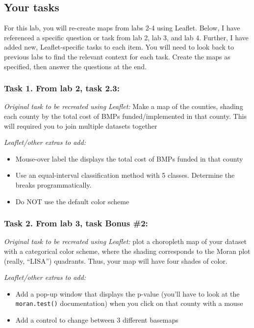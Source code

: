\documentclass[]{article}
\begin{document}
\hypertarget{your-tasks}{%
\subsection{Your tasks}\label{your-tasks}}

For this lab, you will re-create maps from labs 2-4 using Leaflet.
Below, I have referenced a specific question or task from lab 2, lab 3,
and lab 4. Further, I have added new, Leaflet-specific tasks to each
item. You will need to look back to previous labs to find the relevant
context for each task. Create the maps as specified, then answer the
questions at the end.

\hypertarget{task-1.-from-lab-2-task-2.3}{%
\subsubsection{Task 1. From lab 2, task
2.3:}\label{task-1.-from-lab-2-task-2.3}}

\emph{Original task to be recreated using Leaflet:} Make a map of the
counties, shading each county by the total cost of BMPs
funded/implemented in that county. This will required you to join
multiple datasets together

\emph{Leaflet/other extras to add:}

\begin{itemize}
\item
  Mouse-over label the displays the total cost of BMPs funded in that
  county
\item
  Use an equal-interval classification method with 5 classes. Determine
  the breaks programmatically.
\item
  Do NOT use the default color scheme
\end{itemize}

\hypertarget{task-2.-from-lab-3-task-bonus-2}{%
\subsubsection{Task 2. From lab 3, task Bonus
\#2:}\label{task-2.-from-lab-3-task-bonus-2}}

\emph{Original task to be recreated using Leaflet:} plot a choropleth
map of your dataset with a categorical color scheme, where the shading
corresponds to the Moran plot (really, ``LISA'') quadrants. Thus, your
map will have four shades of color.

\emph{Leaflet/other extras to add:}

\begin{itemize}
\item
  Add a pop-up window that displays the p-value (you'll have to look at
  the \texttt{moran.test()} documentation) when you click on that county
  with a mouse
\item
  Add a control to change between 3 different basemaps
\end{itemize}
\end{document}
